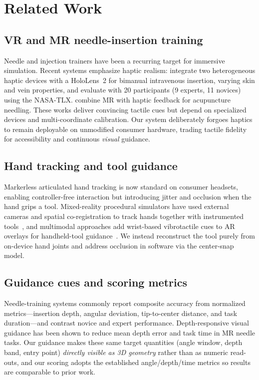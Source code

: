 \documentclass[sigconf]{acmart}
\begin{document}
\section{Related Work}
\subsection{VR and MR needle-insertion training}
Needle and injection trainers have been a recurring target for immersive simulation. Recent
systems emphasize haptic realism: \citet{kim2023bimanual} integrate two heterogeneous haptic
devices with a HoloLens~2 for bimanual intravenous insertion, varying skin and vein properties,
and evaluate with 20 participants (9 experts, 11 novices) using the NASA-TLX. \citet{guruge2025acupuncture}
combine MR with haptic feedback for acupuncture needling. These works deliver convincing tactile
cues but depend on specialized devices and multi-coordinate calibration. Our system deliberately
forgoes haptics to remain deployable on unmodified consumer hardware, trading tactile fidelity for
accessibility and continuous \emph{visual} guidance.

\subsection{Hand tracking and tool guidance}
Markerless articulated hand tracking is now standard on consumer headsets, enabling controller-free
interaction but introducing jitter and occlusion when the hand grips a tool. Mixed-reality
procedural simulators have used external cameras and spatial co-registration to track hands
together with instrumented tools~\cite{spatialtutor2024}, and multimodal approaches add wrist-based
vibrotactile cues to AR overlays for handheld-tool guidance~\cite{yang2026multimodal}. We instead
reconstruct the tool purely from on-device hand joints and address occlusion in software via the
center-snap model.

\subsection{Guidance cues and scoring metrics}
Needle-training systems commonly report composite accuracy from normalized metrics---insertion
depth, angular deviation, tip-to-center distance, and task duration---and contrast novice and
expert performance. Depth-responsive visual guidance has been shown to reduce mean depth error and
task time in MR needle tasks. Our guidance makes these same target quantities (angle window, depth
band, entry point) \emph{directly visible as 3D geometry} rather than as numeric read-outs, and our
scoring adopts the established angle/depth/time metrics so results are comparable to prior work.
\end{document}
